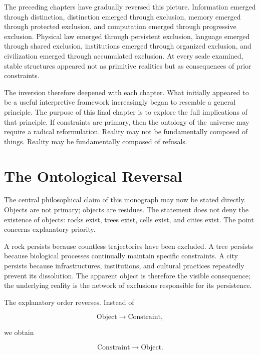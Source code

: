 \documentclass[11pt,oneside]{book}
\theoremstyle{plain}
\theoremstyle{definition}
\theoremstyle{remark}
\begin{document}
The preceding chapters have gradually reversed this picture. Information emerged through distinction, distinction emerged through exclusion, memory emerged through protected exclusion, and computation emerged through progressive exclusion. Physical law emerged through persistent exclusion, language emerged through shared exclusion, institutions emerged through organized exclusion, and civilization emerged through accumulated exclusion. At every scale examined, stable structures appeared not as primitive realities but as consequences of prior constraints.

The inversion therefore deepened with each chapter. What initially appeared to be a useful interpretive framework increasingly began to resemble a general principle. The purpose of this final chapter is to explore the full implications of that principle. If constraints are primary, then the ontology of the universe may require a radical reformulation. Reality may not be fundamentally composed of things. Reality may be fundamentally composed of refusals.

\section{The Ontological Reversal}

The central philosophical claim of this monograph may now be stated directly. Objects are not primary; objects are residues. The statement does not deny the existence of objects: rocks exist, trees exist, cells exist, and cities exist. The point concerns explanatory priority.

A rock persists because countless trajectories have been excluded. A tree persists because biological processes continually maintain specific constraints. A city persists because infrastructures, institutions, and cultural practices repeatedly prevent its dissolution. The apparent object is therefore the visible consequence; the underlying reality is the network of exclusions responsible for its persistence.

The explanatory order reverses. Instead of

\begin{equation}
\text{Object}
\rightarrow
\text{Constraint},
\end{equation}

we obtain

\begin{equation}
\text{Constraint}
\rightarrow
\text{Object}.
\end{equation}
\end{document}
